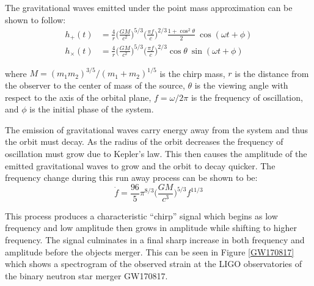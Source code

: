 \documentclass [12pt, proquest]{uwthesis}[2019]
\begin{document}
The gravitational waves emitted under the point mass approximation can be shown to follow:
\begin{align}
h_+(t)&=\frac{4}{r}\bigg(\frac{GM}{c^2}\bigg)^{5/3} \bigg( \frac{\pi f}{c} \bigg)^{2/3} \frac{1+\cos^2\theta}{2} \ \cos(\omega t + \phi)\\
h_\times(t)&=\frac{4}{r}\bigg(\frac{GM}{c^2}\bigg)^{5/3} \bigg( \frac{\pi f}{c} \bigg)^{2/3} \cos\theta\ \sin(\omega t + \phi)
\end{align}

where $M=(m_1 m_2)^{3/5}/(m_1+m_2)^{1/5}$ is the chirp mass, $r$ is the distance from the observer to the center of mass of the source, $\theta$ is the viewing angle with respect to the axis of the orbital plane, $f=\omega/2\pi$ is the frequency of oscillation, and $\phi$ is the initial phase of the system.

The emission of gravitational waves carry energy away from the system and thus the orbit must decay. As the radius of the orbit decreases the frequency of oscillation must grow due to Kepler's law. This then causes the amplitude of the emitted gravitational waves to grow and the orbit to decay quicker. The frequency change during this run away process can be shown to be:
\begin{equation}
\dot{f}=\frac{96}{5}\pi^{8/3}\bigg(\frac{G M}{c^3}\bigg)^{5/3} f^{11/3}
\end{equation}

This process produces a characteristic ``chirp'' signal which begins as low frequency and low amplitude then grows in amplitude while shifting to higher frequency. The signal culminates in a final sharp increase in both frequency and amplitude before the objects merger. This can be seen in Figure \ref{GW170817} which shows a spectrogram of the observed strain at the LIGO observatories of the binary neutron star merger GW170817.
 
\end{document}
